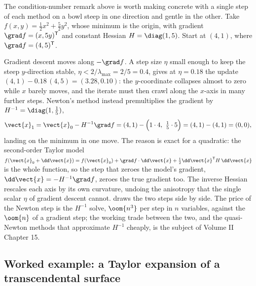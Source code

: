 The condition-number remark above is worth making concrete with a
single step of each method on a bowl steep in one direction and
gentle in the other. Take $f(x, y) = \tfrac{1}{2}x^{2} +
\tfrac{5}{2}y^{2}$, whose minimum is the origin, with gradient
$\grad f = (x, 5 y)^{\mathsf{T}}$ and constant Hessian $H =
\diag(1, 5)$. Start at $(4, 1)$, where $\grad f = (4, 5)^{\mathsf{T}}$.

Gradient descent moves along $-\grad f$. A step size $\eta$ small
enough to keep the steep $y$-direction stable, $\eta < 2/\lambda_{
\max} = 2/5 = 0.4$, gives at $\eta = 0.18$ the update $(4, 1) -
0.18\,(4, 5) = (3.28, 0.10)$: the $y$-coordinate collapses almost to
zero while $x$ barely moves, and the iterate must then crawl along
the $x$-axis in many further steps. Newton's method instead
premultiplies the gradient by $H^{-1} = \diag(1, \tfrac{1}{5})$,
\[
\vect{x}_{1} = \vect{x}_{0} - H^{-1}\grad f
= (4, 1) - \Big(1\cdot 4,\ \tfrac{1}{5}\cdot 5\Big)
= (4, 1) - (4, 1) = (0, 0),
\]
landing on the minimum in one move. The reason is exact for a
quadratic: the second-order Taylor model $f(\vect{x}_{0} +
\dd\vect{x}) = f(\vect{x}_{0}) + \grad f\cdot\dd\vect{x} +
\tfrac{1}{2}\dd\vect{x}^{\mathsf{T}} H\,\dd\vect{x}$ is the whole
function, so the step that zeroes the model's gradient, $\dd\vect{x}
= -H^{-1}\grad f$, zeroes the true gradient too. The inverse Hessian
rescales each axis by its own curvature, undoing the anisotropy that
the single scalar $\eta$ of gradient descent cannot.
 draws the two steps side by side.
The price of the Newton step is the $H^{-1}$ solve, $\oom{n^{3}}$ per
step in $n$ variables, against the $\oom{n}$ of a gradient step; the
working trade between the two, and the quasi-Newton methods that
approximate $H^{-1}$ cheaply, is the subject of Volume II Chapter 15.



\subsection{Worked example: a Taylor expansion of a transcendental
surface}

